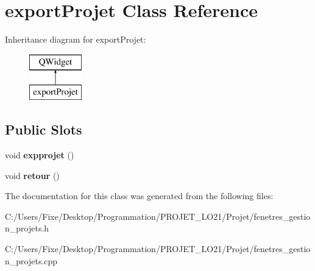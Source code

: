 \hypertarget{classexport_projet}{}\section{export\+Projet Class Reference}
\label{classexport_projet}
Inheritance diagram for export\+Projet\+:\begin{figure}[H]
\begin{center}
\leavevmode
\includegraphics[height=2.000000cm]{classexport_projet}
\end{center}
\end{figure}
\subsection*{Public Slots}
\begin{DoxyCompactItemize}
\item 
\hypertarget{classexport_projet_af36a91560bd892a4ec0d611b17243e9b}{}void {\bfseries expprojet} ()\label{classexport_projet_af36a91560bd892a4ec0d611b17243e9b}

\item 
\hypertarget{classexport_projet_a3aeb300f0b2a40c053a3bb94fd867118}{}void {\bfseries retour} ()\label{classexport_projet_a3aeb300f0b2a40c053a3bb94fd867118}

\end{DoxyCompactItemize}


The documentation for this class was generated from the following files\+:\begin{DoxyCompactItemize}
\item 
C\+:/\+Users/\+Fixe/\+Desktop/\+Programmation/\+P\+R\+O\+J\+E\+T\+\_\+\+L\+O21/\+Projet/fenetres\+\_\+gestion\+\_\+projets.\+h\item 
C\+:/\+Users/\+Fixe/\+Desktop/\+Programmation/\+P\+R\+O\+J\+E\+T\+\_\+\+L\+O21/\+Projet/fenetres\+\_\+gestion\+\_\+projets.\+cpp\end{DoxyCompactItemize}
